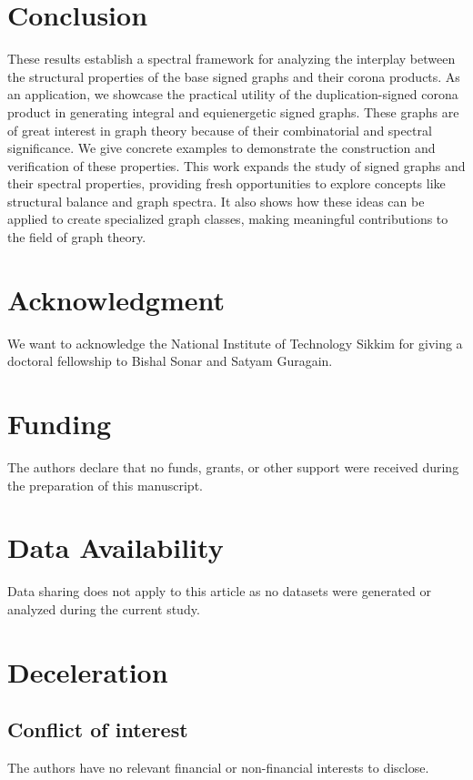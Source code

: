 \documentclass[12pt,a4paper]{article}
\theoremstyle{definition}
\theoremstyle{remark}
\begin{document}
\section{Conclusion}
    These results establish a spectral framework for analyzing the interplay between the structural properties of the base signed graphs and their corona products.
    As an application, we showcase the practical utility of the duplication-signed corona product in generating integral and equienergetic signed graphs. These graphs are of great interest in graph theory because of their combinatorial and spectral significance. We give concrete examples to demonstrate the construction and verification of these properties.
    This work expands the study of signed graphs and their spectral properties, providing fresh opportunities to explore concepts like structural balance and graph spectra. It also shows how these ideas can be applied to create specialized graph classes, making meaningful contributions to the field of graph theory.
    
 \section*{Acknowledgment}
    We want to acknowledge the National Institute of Technology Sikkim for giving a doctoral fellowship to Bishal Sonar and Satyam Guragain.
\section*{Funding}
    The authors declare that no funds, grants, or other support were received during the preparation of this manuscript.
\section*{Data Availability}
    Data sharing does not apply to this article as no datasets were generated or analyzed during the current study.
\section*{Deceleration}
\subsection*{Conflict of interest}
    The authors have no relevant financial or non-financial interests to disclose.
 

\end{document}
